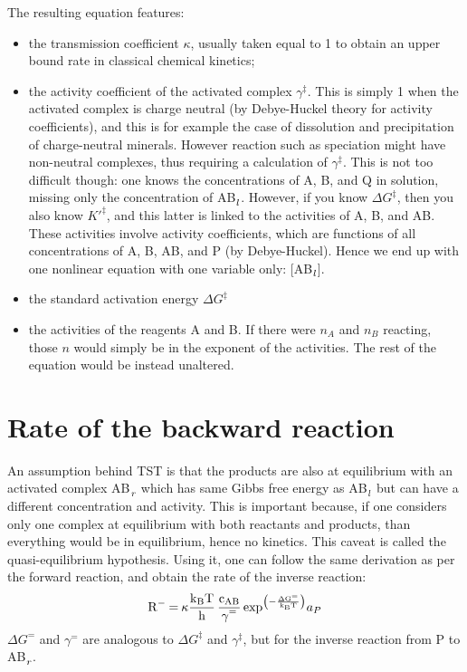 \documentclass[12pt]{paper}    %
\begin{document}
The resulting equation features: 
\begin{itemize}
\item the transmission coefficient $\kappa$, usually taken equal to 1 to obtain an upper bound rate in classical chemical kinetics; 
\item the activity coefficient of the activated complex $\gamma^\ddag$. This  is simply 1 when the activated complex is charge neutral (by Debye-Huckel theory for activity coefficients), and this is for example the case of dissolution and precipitation of charge-neutral minerals. However reaction such as speciation might have non-neutral complexes, thus requiring a calculation of $\gamma^\ddag$. This is not too difficult though: one knows the concentrations of A, B, and Q in solution, missing only the concentration of AB$\ce{_l}$. However, if you know $\Delta G^\ddag$, then you also know $K'^\ddag$, and this latter is linked to the activities of A, B, and AB. These activities involve activity coefficients, which are functions of all concentrations of A, B, AB, and P (by Debye-Huckel). Hence we end up with one nonlinear equation with one variable only: [AB$\ce{_l}$].
\item the standard activation energy $\Delta G^\ddag$
\item the activities of the reagents A and B. If there were $n_A$ and $n_B$ reacting, those $n$ would simply be in the exponent of the activities. The rest of the equation would be instead unaltered.
\end{itemize}


\section{Rate of the backward reaction} 

An assumption behind TST is that the products are also at equilibrium with an activated complex AB$\ce{_r}$ which has same Gibbs free energy as AB$\ce{_l}$ but can have a different concentration and activity. This is important because, if one considers only one complex at equilibrium with both reactants and products, than everything would be in equilibrium, hence no kinetics. This caveat is called the quasi-equilibrium hypothesis. Using it, one can follow the same derivation as per the forward reaction, and obtain the rate of the inverse reaction:
%
\begin{equation}
\ce{R- =  \kappa \frac{k_BT}{h} \frac{c_{AB}}{\gamma^=} exp^{\left( -\frac{\Delta G^=}{k_BT}\right)}} a_P
\end{equation}
%
$\Delta G^=$ and $\gamma^=$ are analogous to $\Delta G^\ddag$ and $\gamma^\ddag$, but for the inverse reaction from P to AB$\ce{_r}$. 
\end{document}
